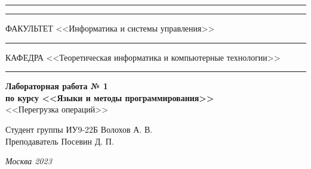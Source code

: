 \documentclass[a4paper, 14pt]{extarticle}
\begin{document}
\begin{titlepage}
\vspace{-25pt}
\hspace{-35pt}\rule{\textwidth}{2.3pt}

\vspace*{-20.3pt}
\hspace{-35pt}\rule{\textwidth}{0.4pt}

\vspace{1.5ex}
\hspace{-35pt} \noindent \small ФАКУЛЬТЕТ\hspace{80pt} <<Информатика и системы управления>>

\vspace*{-16pt}
\hspace{47pt}\rule{0.83\textwidth}{0.4pt}

\vspace{0.5ex}
\hspace{-35pt} \noindent \small КАФЕДРА\hspace{50pt} <<Теоретическая информатика и компьютерные технологии>>

\vspace*{-16pt}
\hspace{30pt}\rule{0.866\textwidth}{0.4pt}
  
\vspace{11em}

\begin{center}
\Large {\bf Лабораторная работа № 1} \\
\large {\bf по курсу <<Языки и методы программирования>>} \\
\large <<Перегрузка операций>> 
\end{center}\normalsize

\vspace{8em}


\begin{flushright}
  {Студент группы ИУ9-22Б Волохов А. В. \hspace*{15pt}\\ 
  \vspace{2ex}
  Преподаватель Посевин Д. П.\hspace*{15pt}}
\end{flushright}

\bigskip

\vfill
 

\begin{center}
\textsl{Москва 2023}
\end{center}
\end{titlepage}
\end{document}
